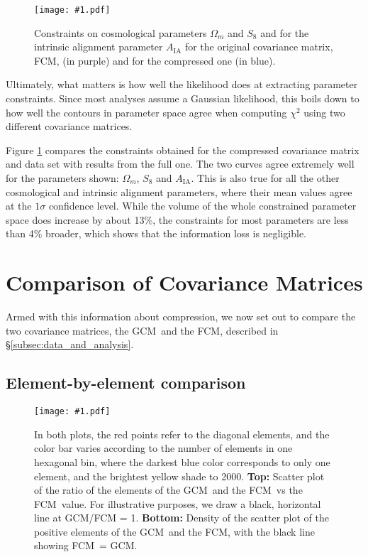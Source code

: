 \documentclass[aps, prd, twocolumn, superscriptaddress, nofootinbib, amssymb, amsmath]{revtex4-2}
\newcommand{\sfig}[3]{
	\texttt{[image: \#1.pdf]}
	\caption{#3}
	\label{fig:#1}
}
\newcommand{\Sfig}[3]{
	\begin{figure}[#1]
		\sfig{#2}{\columnwidth}{#3}
	\end{figure}
}
\newcommand{\rf}[1]{Figure \ref{fig:#1}}
\newcommand{\rssec}[1]{\S\ref{subsec:#1}}
\newcommand\full{the FCM}
\newcommand\gaussian{the GCM}
\begin{document}
\Sfig{b}{Comp2pt-constraints_wmS8A}{Constraints on cosmological parameters $\Omega_m$ and $S_8$ and for the intrinsic alignment parameter $A_{\text{IA}}$ for the original covariance matrix, FCM, (in purple) and for the compressed one (in blue).}

Ultimately, what matters is how well the likelihood does at extracting parameter constraints. Since most analyses assume a Gaussian likelihood, this boils down to how well the contours in parameter space agree when computing $\chi^2$ using two different covariance matrices.	

\rf{Comp2pt-constraints_wmS8A} compares the constraints obtained for the compressed covariance matrix and data set with results from the full one. The two curves agree extremely well for the parameters shown: $\Omega_m$, $S_8$ and $A_{\text{IA}}$. This is also true for all the other cosmological and intrinsic alignment parameters, where their mean values agree at the $1 \sigma$ confidence level. While the volume of the whole constrained parameter space does increase by about 13\%, the constraints for most parameters are less than 4\% broader, which shows that the information loss is negligible.

\section{Comparison of Covariance Matrices}\label{sec:comparison_matrices}

Armed with this information about compression, we now set out to compare the two covariance matrices, \gaussian\ and \full, described in \rssec{data_and_analysis}.

\subsection{Element-by-element comparison}\label{subsec:compare_one-one}

\Sfig{thbp}{Y1-scatter}{In both plots, the red points refer to the diagonal elements, and the color bar varies according to the number of elements in one hexagonal bin, where the darkest blue color corresponds to only one element, and the brightest yellow shade to 2000. \textbf{Top:} Scatter plot of the ratio of the elements of \gaussian\ and \full\ vs \full\ value. For illustrative purposes, we draw a black, horizontal line at GCM/FCM = 1. \textbf{Bottom:} Density of the scatter plot of the positive elements of \gaussian\ and \full, with the black line showing FCM\ = GCM.}
\end{document}
